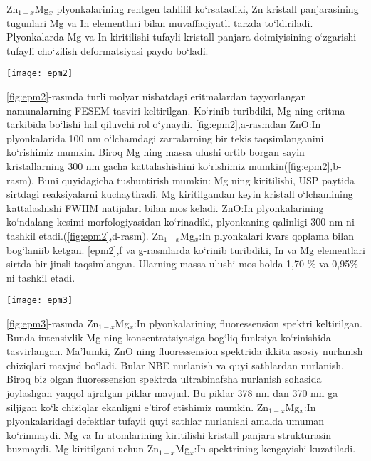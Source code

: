 \documentclass[14pt]{article}
\begin{document}
	Zn$_{1-x}$Mg$_{x}$ plyonkalarining rentgen tahlilil ko`rsatadiki, Zn kristall panjarasining tugunlari Mg va In elementlari bilan muvaffaqiyatli tarzda to`ldiriladi. Plyonkalarda Mg va In kiritilishi tufayli kristall panjara doimiyisining o`zgarishi tufayli cho`zilish deformatsiyasi paydo bo`ladi. 
	
	
	
\begin{figure*}[h]
	\centering
	\texttt{[image: epm2]}
	\caption{Mg ning turli konsentratsiyalarida Zn$_{1-x}$Mg$_{x}$ plyonkalarining FESEM da olingan tasviri: a) x=0,\  b) x=0,05, \ c) x=0,10,\  d) x=0,10, \ e)  namunalarning ko`ndalang kesimi morfologiyasi, x=0,15 da In va Mg elemantlarining taqsimoti (mos holda f va g)}
	\label{fig:epm2}
\end{figure*}


\ref{fig:epm2}-rasmda turli molyar nisbatdagi eritmalardan tayyorlangan namunalarning FESEM tasviri keltirilgan. Ko`rinib turibdiki, Mg ning eritma tarkibida bo`lishi hal qiluvchi rol o`ynaydi. 
\ref{fig:epm2},a-rasmdan ZnO:In plyonkalarida 100 nm o`lchamdagi zarralarning bir tekis taqsimlanganini ko`rishimiz mumkin. Biroq Mg ning massa ulushi ortib borgan sayin kristallarning 300 nm gacha kattalashishini ko`rishimiz mumkin(\ref{fig:epm2},b-rasm). 
Buni quyidagicha tushuntirish mumkin: Mg ning kiritilishi, USP paytida sirtdagi reaksiyalarni kuchaytiradi. Mg kiritilgandan keyin kristall o`lchamining kattalashishi FWHM natijalari bilan mos keladi. ZnO:In plyonkalarining ko`ndalang kesimi morfologiyasidan ko`rinadiki, plyonkaning qalinligi 300 nm ni tashkil etadi.(\ref{fig:epm2},d-rasm). Zn$_{1-x}$Mg$_{x}$:In plyonkalari kvars qoplama bilan bog`laniib ketgan. \ref{epm2},f va g-rasmlarda ko`rinib turibdiki, In va Mg elementlari sirtda bir jinsli taqsimlangan. Ularning massa ulushi mos holda 1,70 \% va 0,95\% ni tashkil etadi. 
	
\begin{figure*}[h]
	\centering
	\texttt{[image: epm3]}
	\caption{Zn$_{1-x}$Mg$_{x}$:In plyonkalarining fotolyuminessension spektri}
	\label{fig:epm3}
\end{figure*}
	\ref{fig:epm3}-rasmda Zn$_{1-x}$Mg$_{x}$:In plyonkalarining fluoressension spektri keltirilgan. Bunda intensivlik Mg ning konsentratsiyasiga bog`liq funksiya ko`rinishida tasvirlangan. Ma'lumki, ZnO ning fluoressension spektrida ikkita asosiy nurlanish chiziqlari mavjud bo`ladi. Bular NBE nurlanish va quyi sathlardan nurlanish. Biroq biz olgan fluoressension spektrda ultrabinafsha nurlanish sohasida joylashgan yaqqol ajralgan piklar mavjud. Bu piklar 378 nm dan 370 nm ga siljigan ko`k chiziqlar ekanligni e'tirof etishimiz mumkin. Zn$_{1-x}$Mg$_{x}$:In plyonkalaridagi defektlar tufayli quyi sathlar nurlanishi amalda umuman ko`rinmaydi. Mg va In atomlarining kiritilishi kristall panjara strukturasin buzmaydi. Mg kiritilgani uchun Zn$_{1-x}$Mg$_{x}$:In spektrining kengayishi kuzatiladi.
	
\end{document}
